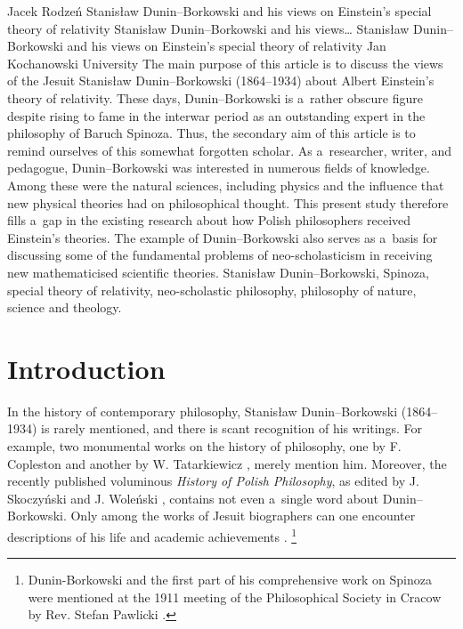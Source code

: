 \begin{artengenv}{Jacek Rodzeń}
	{Stanisław Dunin–Borkowski and his views on Einstein's special theory of relativity}
	{Stanisław Dunin–Borkowski and his views\ldots}
	{Stanisław Dunin–Borkowski and his views on Einstein's special theory of relativity}
	{Jan Kochanowski University}
	{The main purpose of this article is to discuss the views of the Jesuit Stanisław Dunin–Borkowski (1864–1934) about Albert Einstein's theory of relativity. These days, Dunin–Borkowski is a~rather obscure figure despite rising to fame in the interwar period as an outstanding expert in the philosophy of Baruch Spinoza. Thus, the secondary aim of this article is to remind ourselves of this somewhat forgotten scholar. As a~researcher, writer, and pedagogue, Dunin–Borkowski was interested in numerous fields of knowledge. Among these were the natural sciences, including physics and the influence that new physical theories had on philosophical thought. This present study therefore fills a~gap in the existing research about how Polish philosophers received Einstein's theories. The example of Dunin–Borkowski also serves as a~basis for discussing some of the fundamental problems of neo-scholasticism in receiving new mathematicised scientific theories.}
	{Stanisław Dunin–Borkowski, Spinoza, special theory of relativity, neo-scholastic philosophy, philosophy of nature, science and theology.}





\section{Introduction}
\lettrine[loversize=0.13,lines=2,lraise=-0.01,nindent=0em,findent=0.2pt]%
{I}{}n the history of contemporary philosophy, Stanisław Dunin–Borkowski (1864–1934) is rarely mentioned, and there is scant recognition of his writings. For example, two monumental works on the history of philosophy, one by F. Copleston
\parencite*[][p.209]{copleston_history_1994} %
 and another by W. Tatarkiewicz 
\parencite[][p.365]{tatarkiewicz_historia_1998}, %
 merely mention him. Moreover, the recently published voluminous \textit{History of Polish Philosophy}, as edited by J. Skoczyński and J. Woleński 
\parencite*[][]{skoczynski_historia_2010}, %
 contains not even a~single word about Dunin–Borkowski. Only among the works of Jesuit biographers can one encounter descriptions of his life and academic achievements 
\parencites[cf.][]{siwek_stanislaw_1935}[][]{pummerer_p_1935}[][pp.103–104]{darowski_filozofia_2001}.%
\footnote{Dunin-Borkowski and the first part of his comprehensive work on Spinoza were mentioned at the 1911 meeting of the Philosophical Society in Cracow by Rev. Stefan Pawlicki 
\parencite*[][pp.13–14]{pawlicki_spinoza_1912}.%
}


\end{artengenv}
